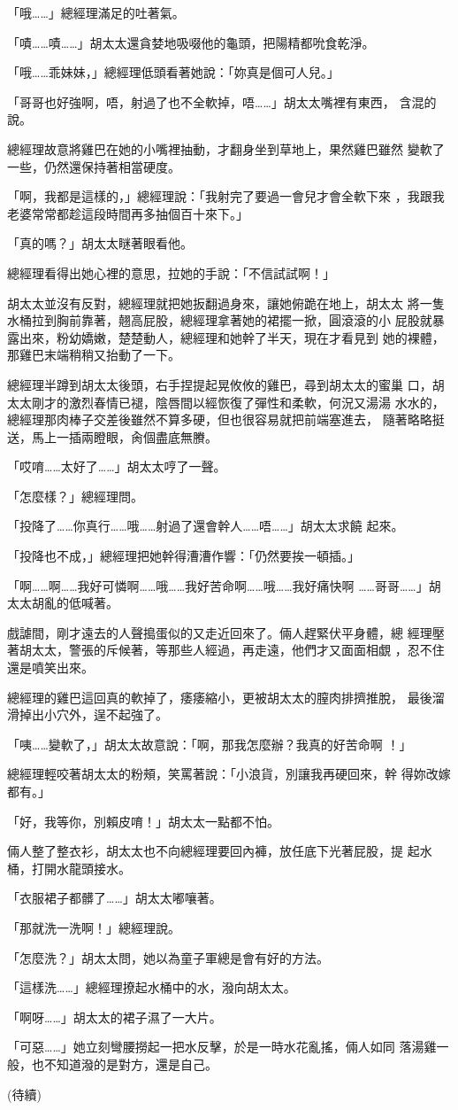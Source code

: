「哦……」總經理滿足的吐著氣。

「嘖……嘖……」胡太太還貪婪地吸啜他的龜頭，把陽精都吮食乾淨。

「哦……乖妹妹，」總經理低頭看著她說：「妳真是個可人兒。」

「哥哥也好強啊，唔，射過了也不全軟掉，唔……」胡太太嘴裡有東西，
含混的說。

總經理故意將雞巴在她的小嘴裡抽動，才翻身坐到草地上，果然雞巴雖然
變軟了一些，仍然還保持著相當硬度。

「啊，我都是這樣的，」總經理說：「我射完了要過一會兒才會全軟下來
，我跟我老婆常常都趁這段時間再多抽個百十來下。」

「真的嗎？」胡太太瞇著眼看他。

總經理看得出她心裡的意思，拉她的手說：「不信試試啊！」

胡太太並沒有反對，總經理就把她扳翻過身來，讓她俯跪在地上，胡太太
將一隻水桶拉到胸前靠著，翹高屁股，總經理拿著她的裙擺一掀，圓滾滾的小
屁股就暴露出來，粉幼嬌嫩，楚楚動人，總經理和她幹了半天，現在才看見到
她的裸體，那雞巴末端稍稍又抬動了一下。

總經理半蹲到胡太太後頭，右手捏提起晃攸攸的雞巴，尋到胡太太的蜜巢
口，胡太太剛才的激烈春情已褪，陰唇間以經恢復了彈性和柔軟，何況又湯湯
水水的，總經理那肉棒子交差後雖然不算多硬，但也很容易就把前端塞進去，
隨著略略挺送，馬上一插兩瞪眼，肏個盡底無賸。

「哎唷……太好了……」胡太太哼了一聲。

「怎麼樣？」總經理問。

「投降了……你真行……哦……射過了還會幹人……唔……」胡太太求饒
起來。

「投降也不成，」總經理把她幹得漕漕作響：「仍然要挨一頓插。」

「啊……啊……我好可憐啊……哦……我好苦命啊……哦……我好痛快啊
……哥哥……」胡太太胡亂的低喊著。

戲謔間，剛才遠去的人聲搗蛋似的又走近回來了。倆人趕緊伏平身體，總
經理壓著胡太太，警張的斥候著，等那些人經過，再走遠，他們才又面面相覷
，忍不住還是噴笑出來。

總經理的雞巴這回真的軟掉了，痿痿縮小，更被胡太太的膣肉排擠推脫，
最後溜滑掉出小穴外，逞不起強了。

「咦……變軟了，」胡太太故意說：「啊，那我怎麼辦？我真的好苦命啊
！」

總經理輕咬著胡太太的粉頰，笑罵著說：「小浪貨，別讓我再硬回來，幹
得妳改嫁都有。」

「好，我等你，別賴皮唷！」胡太太一點都不怕。

倆人整了整衣衫，胡太太也不向總經理要回內褲，放任底下光著屁股，提
起水桶，打開水龍頭接水。

「衣服裙子都髒了……」胡太太嘟嚷著。

「那就洗一洗啊！」總經理說。

「怎麼洗？」胡太太問，她以為童子軍總是會有好的方法。

「這樣洗……」總經理撩起水桶中的水，潑向胡太太。

「啊呀……」胡太太的裙子濕了一大片。

「可惡……」她立刻彎腰撈起一把水反擊，於是一時水花亂搖，倆人如同
落湯雞一般，也不知道潑的是對方，還是自己。

(待續)










